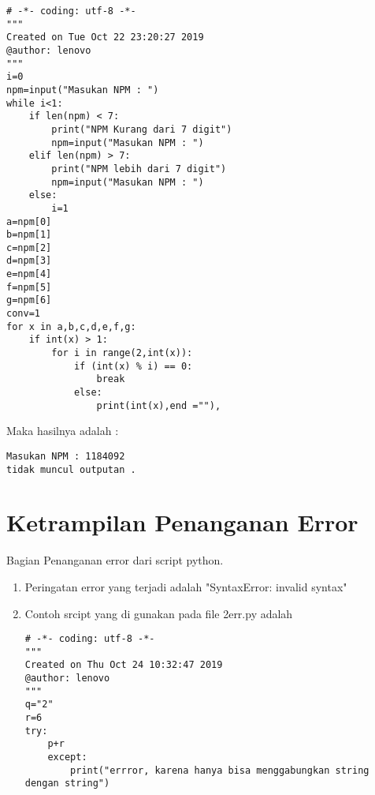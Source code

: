 \begin{enumerate}
\begin{verbatim}
# -*- coding: utf-8 -*-
"""
Created on Tue Oct 22 23:20:27 2019
@author: lenovo
"""
i=0
npm=input("Masukan NPM : ")
while i<1:
    if len(npm) < 7:
        print("NPM Kurang dari 7 digit")
        npm=input("Masukan NPM : ")
    elif len(npm) > 7:
        print("NPM lebih dari 7 digit")
        npm=input("Masukan NPM : ")
    else:
        i=1
a=npm[0]
b=npm[1]
c=npm[2]
d=npm[3]
e=npm[4]
f=npm[5]
g=npm[6]
conv=1
for x in a,b,c,d,e,f,g:
    if int(x) > 1:
        for i in range(2,int(x)):
            if (int(x) % i) == 0:
                break
            else:
                print(int(x),end =""),
\end{verbatim}
Maka hasilnya adalah :
\begin{verbatim}
Masukan NPM : 1184092
tidak muncul outputan .
\end{verbatim}
\end{enumerate}


\section{Ketrampilan Penanganan Error}
Bagian Penanganan error dari script python.
\begin{enumerate}
\item
Peringatan error yang terjadi adalah "SyntaxError: invalid syntax"
\item
Contoh srcipt yang di gunakan pada file 2err.py adalah
\begin{verbatim}
# -*- coding: utf-8 -*-
"""
Created on Thu Oct 24 10:32:47 2019
@author: lenovo
"""
q="2"
r=6
try:
    p+r
    except:
        print("errror, karena hanya bisa menggabungkan string dengan string")
\end{verbatim}
\end{enumerate}

